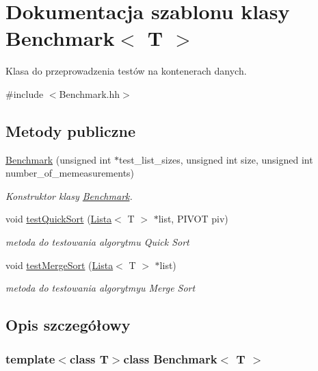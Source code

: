 \hypertarget{class_benchmark}{\section{Dokumentacja szablonu klasy Benchmark$<$ T $>$}
\label{class_benchmark}
}


Klasa do przeprowadzenia testów na kontenerach danych.  




{\ttfamily \#include $<$Benchmark.\-hh$>$}

\subsection*{Metody publiczne}
\begin{DoxyCompactItemize}
\item 
\hyperlink{class_benchmark_a15ccd21b999908da42c58bd5d127c674}{Benchmark} (unsigned int $\ast$test\-\_\-list\-\_\-sizes, unsigned int size, unsigned int number\-\_\-of\-\_\-memeasurements)
\begin{DoxyCompactList}\small\item\em Konstruktor klasy \hyperlink{class_benchmark}{Benchmark}. \end{DoxyCompactList}\item 
void \hyperlink{class_benchmark_ac6a294f9ac4fbba06f0a608eb241d3b0}{test\-Quick\-Sort} (\hyperlink{class_lista}{Lista}$<$ T $>$ $\ast$list, P\-I\-V\-O\-T piv)
\begin{DoxyCompactList}\small\item\em metoda do testowania algorytmu Quick Sort \end{DoxyCompactList}\item 
void \hyperlink{class_benchmark_a90eb1776343e90f4fcbf3fb95aa52bef}{test\-Merge\-Sort} (\hyperlink{class_lista}{Lista}$<$ T $>$ $\ast$list)
\begin{DoxyCompactList}\small\item\em metoda do testowania algorytmyu Merge Sort \end{DoxyCompactList}\end{DoxyCompactItemize}


\subsection{Opis szczegółowy}
\subsubsection*{template$<$class T$>$class Benchmark$<$ T $>$}

